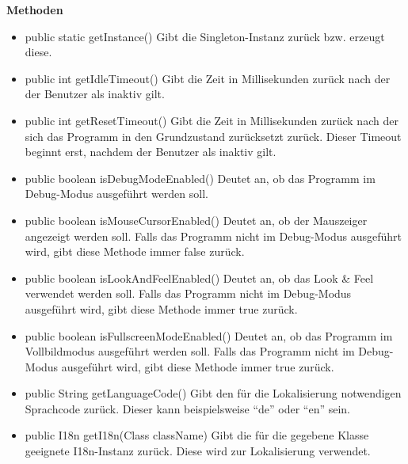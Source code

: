 \documentclass{article}
\begin{document}
    \textbf{Methoden}
      \begin{itemize}
        \item public static getInstance()\newline
              Gibt die Singleton-Instanz zurück bzw. erzeugt diese.
        \item public int getIdleTimeout()\newline
              Gibt die Zeit in Millisekunden zurück nach der der Benutzer als inaktiv gilt.
        \item public int getResetTimeout()\newline
              Gibt die Zeit in Millisekunden zurück nach der sich das Programm in den Grundzustand
              zurücksetzt zurück. Dieser Timeout beginnt erst, nachdem der Benutzer als inaktiv gilt.
        \item public boolean isDebugModeEnabled()\newline
              Deutet an, ob das Programm im Debug-Modus ausgeführt werden soll.
        \item public boolean isMouseCursorEnabled()\newline
              Deutet an, ob der Mauszeiger angezeigt werden soll. Falls das Programm nicht im Debug-Modus
              ausgeführt wird, gibt diese Methode immer false zurück.
        \item public boolean isLookAndFeelEnabled()\newline
              Deutet an, ob das Look \& Feel verwendet werden soll. Falls das Programm nicht im Debug-Modus
              ausgeführt wird, gibt diese Methode immer true zurück.
        \item public boolean isFullscreenModeEnabled()\newline
              Deutet an, ob das Programm im Vollbildmodus ausgeführt werden soll. Falls das Programm nicht
              im Debug-Modus ausgeführt wird, gibt diese Methode immer true zurück.
        \item public String getLanguageCode()\newline
              Gibt den für die Lokalisierung notwendigen Sprachcode zurück. Dieser kann beispielsweise ``de''
              oder ``en'' sein.
        \item public I18n getI18n(Class className)\newline
              Gibt die für die gegebene Klasse geeignete I18n-Instanz zurück. Diese wird zur Lokalisierung
              verwendet.
      \end{itemize}
\end{document}

